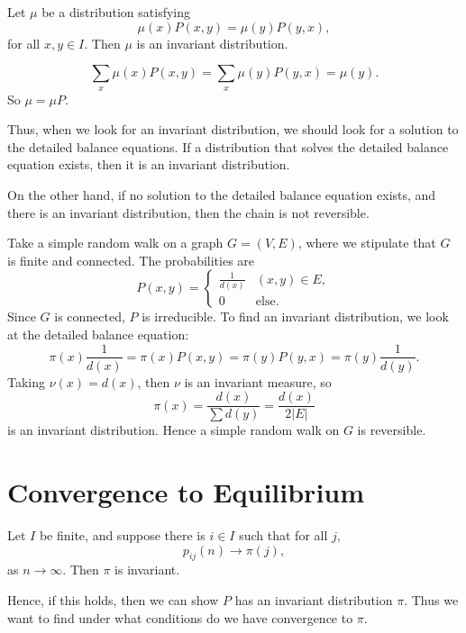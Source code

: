 \documentclass[12pt]{article}
\begin{document}
\begin{lemma}
	Let $\mu$ be a distribution satisfying
	\[
		\mu(x) P(x, y) = \mu(y) P(y, x)
	,\]
	for all $x, y \in I$. Then $\mu$ is an invariant distribution.
\end{lemma}

\begin{proofbox}
	\[
		\sum_{x} \mu(x)P(x, y) = \sum_{x} \mu(y) P(y, x) = \mu(y)
	.\]
	So $\mu = \mu P$.
\end{proofbox}

Thus, when we look for an invariant distribution, we should look for a solution to the detailed balance equations. If a distribution that solves the detailed balance equation exists, then it is an invariant distribution.

On the other hand, if no solution to the detailed balance equation exists, and there is an invariant distribution, then the chain is not reversible.

\begin{exbox}
	Take a simple random walk on a graph $G = (V, E)$, where we stipulate that $G$ is finite and connected. The probabilities are
	\[
		P(x, y) =
		\begin{cases}
			\frac{1}{d(x)} & (x, y) \in E, \\
			0 & \text{else}.
		\end{cases}
	\]
	Since $G$ is connected, $P$ is irreducible. To find an invariant distribution, we look at the detailed balance equation:
	\[
		\pi(x) \frac{1}{d(x)} = \pi(x) P(x, y) = \pi(y) P(y, x) = \pi(y) \frac{1}{d(y)}
	.\]
	Taking $\nu(x) = d(x)$, then $\nu$ is an invariant measure, so
	\[
		\pi(x) = \frac{d(x)}{\sum d(y)} = \frac{d(x)}{2|E|}
	\]
	is an invariant distribution. Hence a simple random walk on $G$ is reversible.
\end{exbox}

\newpage

\section{Convergence to Equilibrium}%
\label{sec:convergence_to_equilibrium}

\begin{theorem}
	Let $I$ be finite, and suppose there is $i \in I$ such that for all $j$,
	\[
		p_{ij}(n) \to \pi(j)
	,\]
	as $n \to \infty$. Then $\pi$ is invariant.
\end{theorem}

Hence, if this holds, then we can show $P$ has an invariant distribution $\pi$. Thus we want to find under what conditions do we have convergence to $\pi$.
\end{document}
